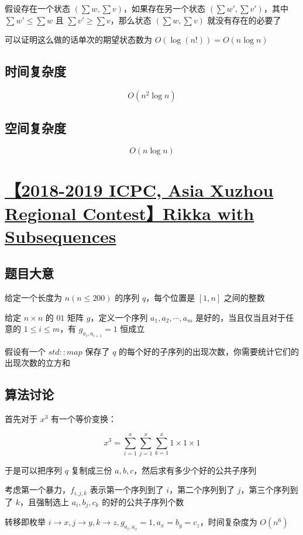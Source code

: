 \documentclass[UTF8]{article}
\begin{document}
假设存在一个状态 $(\sum w,\sum v)$，如果存在另一个状态 $(\sum w',\sum v')$，其中 $\sum w' \le \sum w$ 且 $\sum v' \ge \sum v$，那么状态 $(\sum w, \sum v)$ 就没有存在的必要了

可以证明这么做的话单次的期望状态数为 $O(\log (n!))=O(n \log n)$

\subsection{时间复杂度}

$$
O(n^2 \log n)
$$

\subsection{空间复杂度}

$$
O(n \log n)
$$

\section{\href{https://nanti.jisuanke.com/t/34061}{【2018-2019 ICPC, Asia Xuzhou Regional Contest】Rikka with Subsequences}}

\subsection{题目大意}

给定一个长度为 $n(n \le 200)$ 的序列 $q$，每个位置是 $[1, n]$ 之间的整数

给定 $n \times n$ 的 $01$ 矩阵 $g$，定义一个序列 $a_1,a_2, \cdots, a_m$ 是好的，当且仅当且对于任意的 $1 \le i \le m$，有 $g_{a_i,a_{i+1}}=1$ 恒成立

假设有一个 $std::map$ 保存了 $q$ 的每个好的子序列的出现次数，你需要统计它们的出现次数的立方和

\subsection{算法讨论}

首先对于 $x^3$ 有一个等价变换：

$$
x^3=\sum_{i=1}^{x}\sum_{j=1}^{x}\sum_{k=1}^{x}1 \times 1 \times 1
$$

于是可以把序列 $q$ 复制成三份 $a,b,c$，然后求有多少个好的公共子序列

考虑第一个暴力，$f_{i,j,k}$ 表示第一个序列到了 $i$，第二个序列到了 $j$，第三个序列到了 $k$，且强制选上 $a_i,b_j,c_k$ 的好的公共子序列个数

转移即枚举 $i \to x, j \to y, k \to z, g_{a_i, a_{x}}=1,a_x=b_y=c_z$，时间复杂度为 $O(n^6)$
\end{document}
